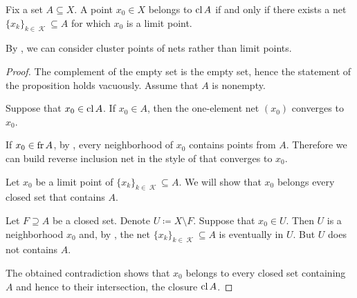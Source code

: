 \begin{proposition}\label{thm:limit_point_iff_in_closure}
  Fix a set \( A \subseteq X \). A point \( x_0 \in X \) belongs to \( \operatorname{cl}{A} \) if and only if there exists a net \( \{ x_k \}_{k \in \mscrK} \subseteq A \) for which \( x_0 \) is a limit point.

  By , we can consider cluster points of nets rather than limit points.
\end{proposition}
\begin{proof}
  The complement of the empty set is the empty set, hence the statement of the proposition holds vacuously. Assume that \( A \) is nonempty.

  \SufficiencySubProof Suppose that \( x_0 \in \operatorname{cl}{A} \). If \( x_0 \in A \), then the one-element net \( (x_0) \) converges to \( x_0 \).

  If \( x_0 \in \operatorname{fr}{A} \), by , every neighborhood of \( x_0 \) contains points from \( A \). Therefore we can build reverse inclusion net in the style of  that converges to \( x_0 \).

  \NecessitySubProof Let \( x_0 \) be a limit point of \( \{ x_k \}_{k \in \mscrK} \subseteq A \). We will show that \( x_0 \) belongs every closed set that contains \( A \).

  Let \( F \supseteq A \) be a closed set. Denote \( U \coloneqq X \setminus F \). Suppose that \( x_0 \in U \). Then \( U \) is a neighborhood \( x_0 \) and, by , the net \( \{ x_k \}_{k \in \mscrK} \subseteq A \) is eventually in \( U \). But \( U \) does not contains \( A \).

  The obtained contradiction shows that \( x_0 \) belongs to every closed set containing \( A \) and hence to their intersection, the closure \( \operatorname{cl} A \).
\end{proof}

